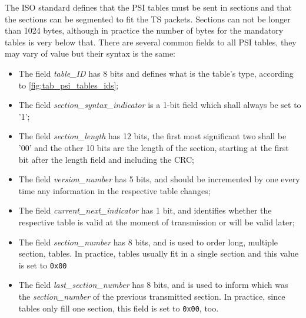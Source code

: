 \documentclass[
	12pt,				%
	openright,			%
	twoside,			%
	a4paper,			%
	brazil,
	french,				%
	english
	]{abntex2}
\begin{document}
The ISO standard defines that the PSI tables must be sent in sections and that the sections can be segmented to fit the TS packets. Sections can not be longer than 1024 bytes, although in practice the number of bytes for the mandatory tables is very below that. There are several common fields to all PSI tables, they may vary of value but their syntax is the same:
\begin{itemize}
\item{The field \textit{table\hspace{0.1mm}\_\hspace{0.1mm}ID} has 8 bits and defines what is the table's type, according to \autoref{fig:tab_psi_tables_ids};}
\item{The field \textit{section\hspace{0.1mm}\_\hspace{0.1mm}syntax\hspace{0.1mm}\_\hspace{0.1mm}indicator} is a 1-bit field which shall always be set to '1';}
\item{The field \textit{section\hspace{0.1mm}\_\hspace{0.1mm}length} has 12 bits, the first most significant two shall be '00' and the other 10 bits are the length of the section, starting at the first bit after the length field and including the CRC;}
\item{The field \textit{version\hspace{0.1mm}\_\hspace{0.1mm}number} has 5 bits, and should be incremented by one every time any information in the respective table changes;}
\item{The field \textit{current\hspace{0.1mm}\_\hspace{0.1mm}next\hspace{0.1mm}\_\hspace{0.1mm}indicator} has 1 bit, and identifies whether the respective table is valid at the moment of transmission or will be valid later;}
\item{The field \textit{section\hspace{0.1mm}\_\hspace{0.1mm}number} has 8 bits, and is used to order long, multiple section, tables. In practice, tables usually fit in a single section and this value is set to \texttt{0x00}}
\item{The field \textit{last\hspace{0.1mm}\_\hspace{0.1mm}section\hspace{0.1mm}\_\hspace{0.1mm}number} has 8 bits, and is used to inform which was the \textit{section\hspace{0.1mm}\_\hspace{0.1mm}number} of the previous transmitted section. In practice, since tables only fill one section, this field is set to \texttt{0x00}, too.}
\end{itemize}
\end{document}
